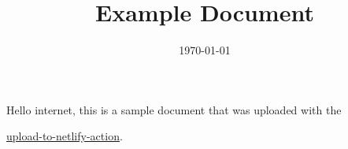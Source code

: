 \documentclass{article}
\title{Example Document}
\date{\today}
\begin{document}
\maketitle

Hello internet, this is a sample document that was uploaded with the

\underline{\href{https://githuh.com/MrFlynn/upload-to-netlfy-action}{upload-to-netlify-action}}.
\end{document}
